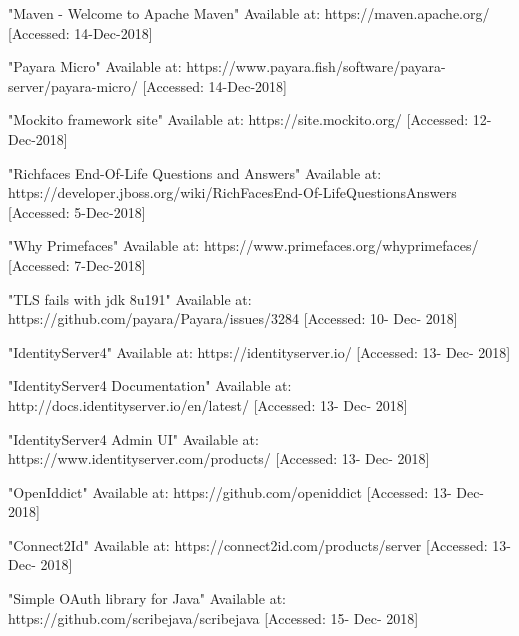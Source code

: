  "Maven - Welcome to Apache Maven"
Available at: https://maven.apache.org/ [Accessed: 14-Dec-2018]

 "Payara Micro"
Available at: https://www.payara.fish/software/payara-server/payara-micro/ [Accessed: 14-Dec-2018]

 "Mockito framework site"
Available at: https://site.mockito.org/ [Accessed: 12-Dec-2018]

 "Richfaces End-Of-Life Questions and Answers"
Available at: https://developer.jboss.org/wiki/RichFacesEnd-Of-LifeQuestionsAnswers [Accessed: 5-Dec-2018]

 "Why Primefaces"
Available at: https://www.primefaces.org/whyprimefaces/ [Accessed: 7-Dec-2018]

 "TLS fails with jdk 8u191" Available at: https://github.com/payara/Payara/issues/3284 [Accessed: 10- Dec- 2018]

 "IdentityServer4" Available at: https://identityserver.io/ [Accessed: 13- Dec- 2018]

 "IdentityServer4 Documentation" Available at: http://docs.identityserver.io/en/latest/ [Accessed: 13- Dec- 2018]

 "IdentityServer4 Admin UI" Available at: https://www.identityserver.com/products/ [Accessed: 13- Dec- 2018]

 "OpenIddict" Available at: https://github.com/openiddict [Accessed: 13- Dec- 2018]

 "Connect2Id" Available at: https://connect2id.com/products/server [Accessed: 13- Dec- 2018]

 "Simple OAuth library for Java" Available at: https://github.com/scribejava/scribejava [Accessed: 15- Dec- 2018]
